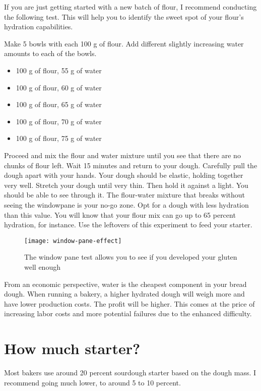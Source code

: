 If you are just getting started with a new batch of flour,
I recommend conducting the following test. This will help you to
identify the sweet spot of your flour's hydration capabilities.

Make 5 bowls with each 100 g of flour. Add different slightly increasing
water amounts to each of the bowls.

\begin{itemize}
  \item 100 g of flour, 55 g of water
  \item 100 g of flour, 60 g of water
  \item 100 g of flour, 65 g of water
  \item 100 g of flour, 70 g of water
  \item 100 g of flour, 75 g of water
\end{itemize}

Proceed and mix the flour and water mixture until you see that there
are no chunks of flour left. Wait 15 minutes and return to your dough.
Carefully pull the dough apart with your hands. Your dough should be elastic, holding
together very well. Stretch your dough until very thin. Then hold it against a light.
You should be able to see through it. The flour-water mixture that breaks without
seeing the windowpane is your no-go zone. Opt for a dough with
less hydration than this value. You will know that your flour mix can go up to
65 percent hydration, for instance. Use the leftovers of this experiment
to feed your starter.


\begin{figure}[!htb]
  \texttt{[image: window-pane-effect]}
  \caption
    {The window pane test allows you to see if you developed your gluten well enough}
\end{figure}


From an economic perspective, water is the cheapest component in your bread
dough. When running a bakery, a higher hydrated dough will weigh more and have
lower production costs. The profit will be higher. This comes at the price
of increasing labor costs and more potential failures due to the enhanced
difficulty.

\section{How much starter?}

Most bakers use around 20 percent sourdough starter based on the dough mass. I
recommend going much lower, to around 5 to 10 percent.

